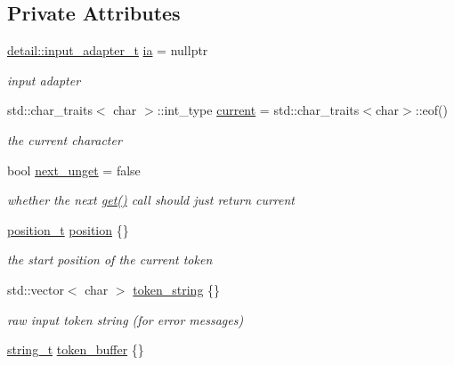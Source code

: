\subsection*{Private Attributes}
\begin{DoxyCompactItemize}
\item 
\hyperlink{namespacenlohmann_1_1detail_ae132f8cd5bb24c5e9b40ad0eafedf1c2}{detail\+::input\+\_\+adapter\+\_\+t} \hyperlink{classnlohmann_1_1detail_1_1lexer_aa7e69cd9d51451fd798eaf501b40421f}{ia} = nullptr
\begin{DoxyCompactList}\small\item\em input adapter \end{DoxyCompactList}\item 
std\+::char\+\_\+traits$<$ char $>$\+::int\+\_\+type \hyperlink{classnlohmann_1_1detail_1_1lexer_a47169f9aaf0da4c9885e61d3109859aa}{current} = std\+::char\+\_\+traits$<$char$>$\+::eof()
\begin{DoxyCompactList}\small\item\em the current character \end{DoxyCompactList}\item 
bool \hyperlink{classnlohmann_1_1detail_1_1lexer_ae8bedb97b907ba6347c5b2f2666ca01f}{next\+\_\+unget} = false
\begin{DoxyCompactList}\small\item\em whether the next \hyperlink{classnlohmann_1_1detail_1_1lexer_a901e45a34e1fb1d97ab62350b0c3ef26}{get()} call should just return current \end{DoxyCompactList}\item 
\hyperlink{structnlohmann_1_1detail_1_1position__t}{position\+\_\+t} \hyperlink{classnlohmann_1_1detail_1_1lexer_a932a1b4133619f08fc7442b52368385e}{position} \{\}
\begin{DoxyCompactList}\small\item\em the start position of the current token \end{DoxyCompactList}\item 
std\+::vector$<$ char $>$ \hyperlink{classnlohmann_1_1detail_1_1lexer_ad2960e3d54af8fb8d572a8f6f7731d62}{token\+\_\+string} \{\}
\begin{DoxyCompactList}\small\item\em raw input token string (for error messages) \end{DoxyCompactList}\item 
\hyperlink{classnlohmann_1_1detail_1_1lexer_ab63d35c658887592a4b09ad26eb4c795}{string\+\_\+t} \hyperlink{classnlohmann_1_1detail_1_1lexer_a8f43746570e5cadbc9b2b6b0c4c8e051}{token\+\_\+buffer} \{\}

\end{DoxyCompactItemize}
